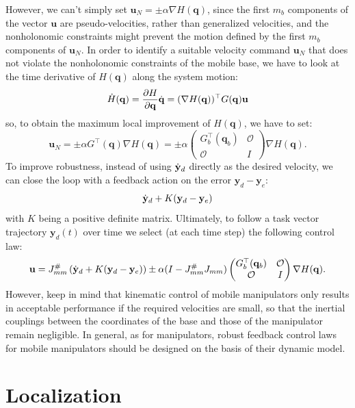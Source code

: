 \documentclass[10pt, a4paper]{report}
\newcommand{\y}{{\mathbf y}}
\newcommand{\q}{{\mathbf q}}
\begin{document}
However, we can't simply set $\mathbf u_N=\pm\alpha\nabla H(\q)$, since the first $m_b$ components of the vector $\mathbf u$ are
pseudo-velocities, rather than generalized velocities, and the nonholonomic constraints might prevent the motion defined by the first $m_b$ components of $\mathbf u_N$. In order to identify a suitable velocity command $\mathbf u_N$ that does not violate the nonholonomic constraints of the mobile base, we have to look at the time derivative of $H(\q)$ along the system motion:\begin{equation}
    \dot H(\q)=\frac{\partial H}{\partial \q}\dq=(\nabla H(\q))^\top G(\q)\mathbf u
\end{equation}  
so, to obtain the maximum local improvement of $H(\q)$, we have to set:\begin{equation}
    \mathbf u_N=\pm\alpha G^\top(\q)\nabla H(\q)=\pm\alpha\begin{pmatrix}
        G_b^\top(\q_b) & \mathcal O \\ 
        \mathcal O& I
    \end{pmatrix}\nabla H(\q).
\end{equation}
To improve robustness, instead of using ${\dot{\mathbf y}}_d$ directly as the desired velocity, we can close the loop with a feedback action on the error $\y_d-\y_e$:\begin{equation}
    \dy_d+K(\y_d-\y_e)
\end{equation}
with $K$ being a positive definite matrix. Ultimately, to follow a task vector trajectory $\y_d(t)$ over time we select (at each time step) the following control law:\begin{equation}
    \mathbf u = J_{mm}^\#\left(
        \dy_d+K(\y_d-\y_e)
    \right)
    \pm
    \alpha(I-J_{mm}^\#J_{mm})\begin{pmatrix}
        G_b^\top(\q_b) & \mathcal O \\ 
        \mathcal O& I
    \end{pmatrix}\nabla H(\q).
\end{equation}
However, keep in mind that kinematic control of mobile manipulators
only results in acceptable performance if the required
velocities are small, so that the inertial couplings
between the coordinates of the base and those of the
manipulator remain negligible. In general, as for manipulators, robust feedback control
laws for mobile manipulators should be designed on the basis of their
dynamic model.
\chapter{Localization}
\end{document}
